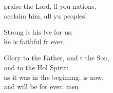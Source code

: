 \begin{psalmverse}
  \begin{patverse}
     praise the Lord, ll you nations,\Med\\
acclaim him, all yu peoples!

Strong is his lve for us;\Med\\
he is faithful fr ever.

Glory to the Father, and t the Son,\Med\\
and to the Hol Spirit:\\
as it was in the beginn\pointup{\i}ng, is now,\Med\\
and will be for ever. men
  \end{patverse}
\end{psalmverse}
